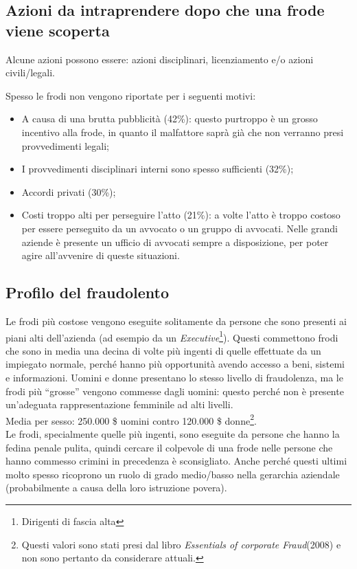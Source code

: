 \subsection{Azioni da intraprendere dopo che una frode viene scoperta}

Alcune azioni possono essere: azioni disciplinari, licenziamento e/o azioni 
civili/legali.

Spesso le frodi non vengono riportate per i seguenti motivi:
\begin{itemize}
  \item A causa di una brutta pubblicità (42\%): questo purtroppo è un grosso 
  incentivo alla frode, in quanto il malfattore
  saprà già che non verranno presi provvedimenti legali;
  \item I provvedimenti disciplinari interni sono spesso sufficienti (32\%);
  \item Accordi privati (30\%);
  \item Costi troppo alti per perseguire l'atto (21\%): a volte l'atto è troppo 
  costoso per essere perseguito da un avvocato o un
  gruppo di avvocati. Nelle grandi aziende è presente un ufficio di avvocati
  sempre a disposizione, per poter agire all'avvenire di queste situazioni.
\end{itemize}

\subsection{Profilo del fraudolento}

Le frodi più costose vengono eseguite solitamente da persone che sono presenti
ai piani alti dell'azienda (ad esempio da un \textit{Executive}\footnote{Dirigenti 
di fascia alta}). Questi commettono frodi che sono in media una decina di volte
più ingenti di quelle effettuate da un impiegato normale, perché hanno 
più opportunità avendo accesso a beni, sistemi e informazioni. Uomini e donne presentano 
lo stesso livello di fraudolenza, ma le frodi più ``grosse'' vengono commesse dagli 
uomini: questo perché non è presente un'adeguata rappresentazione femminile ad 
alti livelli.\\
\newline
Media per sesso: 250.000 \${} uomini contro 120.000 \${} 
donne\footnote{Questi valori sono stati presi dal libro \textit{Essentials
of corporate Fraud}(2008) e non sono pertanto da considerare attuali.}.\\
\newline
Le frodi, specialmente quelle più ingenti, sono eseguite da persone che hanno la fedina
penale pulita, quindi cercare il colpevole di una frode nelle persone che hanno commesso
 crimini in precedenza è sconsigliato. Anche perché questi ultimi molto spesso ricoprono 
un ruolo di grado medio/basso nella gerarchia aziendale (probabilmente a causa della 
loro istruzione povera).

